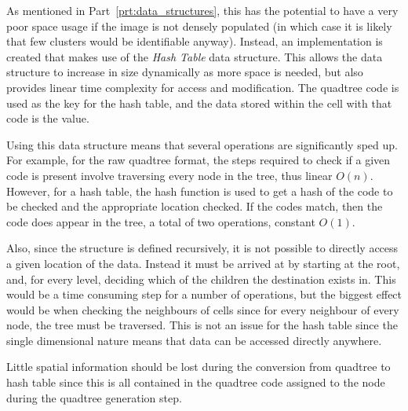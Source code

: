 As mentioned in Part~\ref{prt:data_structures}, this has the potential to
have a very poor space usage if the image is not densely populated (in which
case it is likely that few clusters would be identifiable anyway). Instead, an
implementation is created that makes use of the \emph{Hash Table} data
structure\cite{cormen2001introduction}. This allows the data structure to
increase in size dynamically as more space is needed, but also provides linear
time complexity for access and modification. The quadtree code is used as the
key for the hash table, and the data stored within the cell with that code is
the value.

Using this data structure means that several operations are significantly sped
up. For example, for the raw quadtree format, the steps required to check if a
given code is present involve traversing every node in the tree, thus linear
$O(n)$.  However, for a hash table, the hash function is used to get a hash of
the code to be checked and the appropriate location checked. If the codes
match, then the code does appear in the tree, a total of two operations,
constant $O(1)$.

Also, since the structure is defined recursively, it is not possible to
directly access a given location of the data. Instead it must be arrived at by
starting at the root, and, for every level, deciding which of the children the
destination exists in. This would be a time consuming step for a number of
operations, but the biggest effect would be when checking the neighbours of
cells since for every neighbour of every node, the tree must be traversed. This
is not an issue for the hash table since the single dimensional nature means
that data can be accessed directly anywhere.

Little spatial information should be lost during the conversion from quadtree
to hash table since this is all contained in the quadtree code assigned to the
node during the quadtree generation step.
